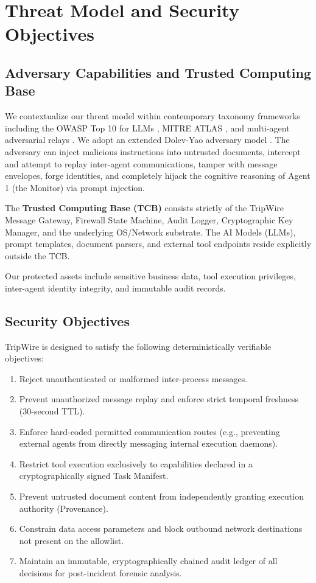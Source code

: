 \documentclass[10pt,a4paper]{article}
\begin{document}
\section{Threat Model and Security Objectives}

\subsection{Adversary Capabilities and Trusted Computing Base}
We contextualize our threat model within contemporary taxonomy frameworks including the OWASP Top 10 for LLMs \cite{owasp_llm}, MITRE ATLAS \cite{mitre_atlas}, and multi-agent adversarial relays \cite{multiagent_llm_security}. We adopt an extended Dolev-Yao adversary model \cite{dolev1983}. The adversary can inject malicious instructions into untrusted documents, intercept and attempt to replay inter-agent communications, tamper with message envelopes, forge identities, and completely hijack the cognitive reasoning of Agent 1 (the Monitor) via prompt injection. 

The \textbf{Trusted Computing Base (TCB)} consists strictly of the TripWire Message Gateway, Firewall State Machine, Audit Logger, Cryptographic Key Manager, and the underlying OS/Network substrate. The AI Models (LLMs), prompt templates, document parsers, and external tool endpoints reside explicitly outside the TCB.

Our protected assets include sensitive business data, tool execution privileges, inter-agent identity integrity, and immutable audit records.

\subsection{Security Objectives}
TripWire is designed to satisfy the following deterministically verifiable objectives:
\begin{enumerate}
    \item Reject unauthenticated or malformed inter-process messages.
    \item Prevent unauthorized message replay and enforce strict temporal freshness (30-second TTL).
    \item Enforce hard-coded permitted communication routes (e.g., preventing external agents from directly messaging internal execution daemons).
    \item Restrict tool execution exclusively to capabilities declared in a cryptographically signed Task Manifest.
    \item Prevent untrusted document content from independently granting execution authority (Provenance).
    \item Constrain data access parameters and block outbound network destinations not present on the allowlist.
    \item Maintain an immutable, cryptographically chained audit ledger of all decisions for post-incident forensic analysis.
\end{enumerate}
\end{document}
